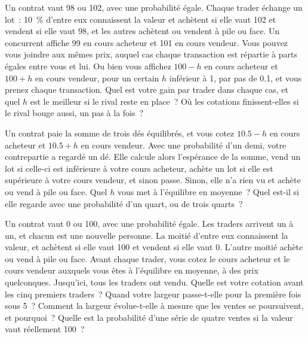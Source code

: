 \begin{question}\label{iq:iv2:making-a-market:21}
Un contrat vaut 98 ou 102, avec une probabilité égale. Chaque trader échange un lot~: 10~\% d'entre eux connaissent la valeur et achètent si elle vaut 102 et vendent si elle vaut 98, et les autres achètent ou vendent à pile ou face. Un concurrent affiche 99 en cours acheteur et 101 en cours vendeur. Vous pouvez vous joindre aux mêmes prix, auquel cas chaque transaction est répartie à parts égales entre vous et lui. Ou bien vous affichez $100 - h$ en cours acheteur et $100 + h$ en cours vendeur, pour un certain $h$ inférieur à 1, par pas de 0.1, et vous prenez chaque transaction. Quel est votre gain par trader dans chaque cas, et quel $h$ est le meilleur si le rival reste en place~? Où les cotations finissent-elles si le rival bouge aussi, un pas à la fois~?
\end{question}

\begin{question}\label{iq:iv2:making-a-market:22}
Un contrat paie la somme de trois dés équilibrés, et vous cotez $10.5 - h$ en cours acheteur et $10.5 + h$ en cours vendeur. Avec une probabilité d'un demi, votre contrepartie a regardé un dé. Elle calcule alors l'espérance de la somme, vend un lot si celle-ci est inférieure à votre cours acheteur, achète un lot si elle est supérieure à votre cours vendeur, et sinon passe. Sinon, elle n'a rien vu et achète ou vend à pile ou face. Quel $h$ vous met à l'équilibre en moyenne~? Quel est-il si elle regarde avec une probabilité d'un quart, ou de trois quarts~?
\end{question}

\begin{question}\label{iq:iv2:making-a-market:23}
Un contrat vaut 0 ou 100, avec une probabilité égale. Les traders arrivent un à un, et chacun est une nouvelle personne. La moitié d'entre eux connaissent la valeur, et achètent si elle vaut 100 et vendent si elle vaut 0. L'autre moitié achète ou vend à pile ou face. Avant chaque trader, vous cotez le cours acheteur et le cours vendeur auxquels vous êtes à l'équilibre en moyenne, à des prix quelconques. Jusqu'ici, tous les traders ont vendu. Quelle est votre cotation avant les cinq premiers traders~? Quand votre largeur passe-t-elle pour la première fois sous 5~? Comment la largeur évolue-t-elle à mesure que les ventes se poursuivent, et pourquoi~? Quelle est la probabilité d'une série de quatre ventes si la valeur vaut réellement 100~?
\end{question}

